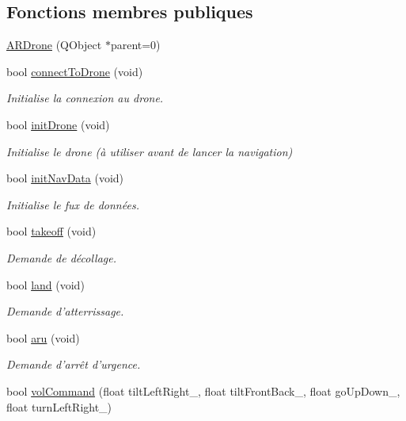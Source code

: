 \subsection*{Fonctions membres publiques}
\begin{DoxyCompactItemize}
\item 
\hyperlink{class_a_r_drone_ae979c9bd8b2e45c7f2ad79b61677c95d}{A\-R\-Drone} (Q\-Object $\ast$parent=0)
\item 
bool \hyperlink{class_a_r_drone_a2fe1afa1efc4ed2306fba14eb9295ebe}{connect\-To\-Drone} (void)
\begin{DoxyCompactList}\small\item\em Initialise la connexion au drone. \end{DoxyCompactList}\item 
bool \hyperlink{class_a_r_drone_a6eeff4af7dcbb8088930f6cdca0e453c}{init\-Drone} (void)
\begin{DoxyCompactList}\small\item\em Initialise le drone (à utiliser avant de lancer la navigation) \end{DoxyCompactList}\item 
bool \hyperlink{class_a_r_drone_ae1a1249d580e6fcd235ac0e171987948}{init\-Nav\-Data} (void)
\begin{DoxyCompactList}\small\item\em Initialise le fux de données. \end{DoxyCompactList}\item 
bool \hyperlink{class_a_r_drone_a990dcded2f78b03960887e6c2bf3e717}{takeoff} (void)
\begin{DoxyCompactList}\small\item\em Demande de décollage. \end{DoxyCompactList}\item 
bool \hyperlink{class_a_r_drone_aa978fd9336466eb938ac12b774adc8d6}{land} (void)
\begin{DoxyCompactList}\small\item\em Demande d'atterrissage. \end{DoxyCompactList}\item 
bool \hyperlink{class_a_r_drone_ae230bca8378a15312d53936b988b30be}{aru} (void)
\begin{DoxyCompactList}\small\item\em Demande d'arrêt d'urgence. \end{DoxyCompactList}\item 
bool \hyperlink{class_a_r_drone_a8d86f42ad281754122fa0fb07e009cfd}{vol\-Command} (float tilt\-Left\-Right\-\_\-, float tilt\-Front\-Back\-\_\-, float go\-Up\-Down\-\_\-, float turn\-Left\-Right\-\_\-)

\end{DoxyCompactItemize}
